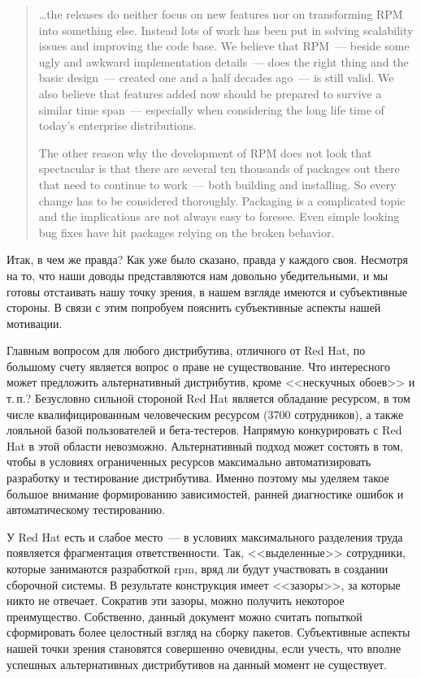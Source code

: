 \documentclass[russian,a4paper,12pt,titlepage]{article}
\begin{document}
\begin{quote}
\ldots the releases do neither focus on new features nor on transforming RPM into something else.
Instead lots of work has been put in solving scalability issues and improving the code base. We believe that RPM~---
beside some ugly and awkward implementation details~--- does the right thing and the basic design~---
created one and a half decades ago~--- is still valid. We also believe that features added now should be prepared
to survive a similar time span~--- especially when considering the long life time of today's enterprise distributions.

The other reason why the development of RPM does not look that spectacular is that there are several ten thousands
of packages out there that need to continue to work~--- both building and installing. So every change has to be
considered thoroughly. Packaging is a complicated topic and the implications are not always easy to foresee.
Even simple looking bug fixes have hit packages relying on the broken behavior.
\end{quote}

Итак, в чем же правда?  Как уже было сказано, правда у каждого своя.  Несмотря на то, что наши доводы представляются
нам довольно убедительными, и мы готовы отстаивать нашу точку зрения, в нашем взгляде имеются и субъективные стороны.
В связи с этим попробуем пояснить субъективные аспекты нашей мотивации.

Главным вопросом для любого дистрибутива, отличного от Red Hat, по большому счету является вопрос о праве не существование.
Что интересного может предложить альтернативный дистрибутив, кроме <<нескучных обоев>> и т.\,п.?  Безусловно сильной стороной
Red Hat является обладание ресурсом, в том числе квалифицированным человеческим ресурсом (3700 сотрудников), а также лояльной
базой пользователей и бета-тестеров.  Напрямую конкурировать с Red Hat в этой области невозможно.  Альтернативный
подход может состоять в том, чтобы в условиях ограниченных ресурсов максимально автоматизировать разработку и тестирование
дистрибутива.  Именно поэтому мы уделяем такое большое внимание формированию зависимостей, ранней диагностике ошибок
и автоматическому тестированию.

У Red Hat есть и слабое место~--- в условиях максимального разделения труда появляется фрагментация ответственности.
Так, <<выделенные>> сотрудники, которые занимаются разработкой rpm, вряд ли будут участвовать в создании сборочной
системы.  В результате конструкция имеет <<зазоры>>, за которые никто не отвечает.  Сократив эти зазоры, можно получить некоторое
преимущество.  Собственно, данный документ можно считать попыткой сформировать более целостный взгляд на сборку пакетов.
Субъективные аспекты нашей точки зрения становятся совершенно очевидны, если учесть, что вполне успешных альтернативных
дистрибутивов на данный момент не существует.
\end{document}
